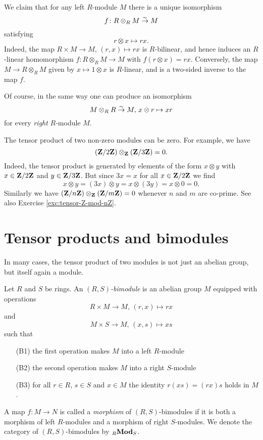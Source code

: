 \begin{example}\label{exa:tensor-with-R}
We claim that for any left $R$-module $M$ there is a unique isomorphism 
\[
	f\colon R\otimes_R M \overset{\sim}{\to} M
\]
satisfying
\[
	r\otimes x \mapsto rx.
\]
Indeed, the map $R\times M \to M,\, (r,x) \mapsto rx$
is $R$-bilinear, and hence induces an $R$-linear homomorphism
$f\colon R\otimes_R M \to M$ with $f(r\otimes x)=rx$. Conversely, the map
$M \to R\otimes_R M$ given by $x \mapsto 1\otimes x$
is $R$-linear, and is a two-sided inverse to the map $f$.

Of course, in the same way one can produce an isomorphism
\[
	 M\otimes_R R \overset{\sim}{\to} M,\, x \otimes r \mapsto xr
\]
for every \emph{right} $R$-module $M$.
\end{example}

\begin{example}
The tensor product of two non-zero modules can be zero. For example, we have
\[
	({\mathbf{Z}}/2{\mathbf{Z}}) \otimes_{\mathbf{Z}} ({\mathbf{Z}}/3{\mathbf{Z}}) = 0.
\]
Indeed, the tensor product is generated by elements of the form $x\otimes y$ with $x\in {\mathbf{Z}}/2{\mathbf{Z}}$ and $y\in {\mathbf{Z}}/3{\mathbf{Z}}$. But since
$3x=x$ for all $x\in {\mathbf{Z}}/2{\mathbf{Z}}$ we find 
\[
	x\otimes y = (3x) \otimes y  = x \otimes (3y) = x\otimes 0 =  0.
\]
Similarly we have $({\mathbf{Z}}/n{\mathbf{Z}})\otimes_{\mathbf{Z}} ({\mathbf{Z}}/m{\mathbf{Z}})=0$ whenever $n$ and $m$ are co-prime. See also Exercise \ref{exc:tensor-Z-mod-nZ}.
\end{example}


\section{Tensor products and bimodules}

In many cases, the tensor product of two modules is not just an abelian group, but itself again a module. 

\begin{definition}
Let $R$ and $S$ be rings.
An \emph{$(R,S)$-bimodule} is an abelian group $M$ equipped with operations
\[
	R\times M \to M,\, (r,x) \mapsto rx
\]
and 
\[
	M \times S \to M,\, (x,s) \mapsto xs
\]
such that 
\begin{enumerate}
\item[(B1)] the first operation makes $M$ into a left $R$-module 
\item[(B2)] the second operation makes $M$ into a right $S$-module
\item[(B3)] for all $r\in R$, $s\in S$ and $x\in M$ the identity $r(xs)=(rx)s$ holds in $M$.
\end{enumerate}
A map  $f\colon M \to N$  is called a \emph{morphism} of $(R,S)$-bimodules if it is both a morphism
of left $R$-modules and a morphism of right $S$-modules. We denote the category of $(R,S)$-bimodules by ${}_R\mathbf{Mod}_S$.
\end{definition}

